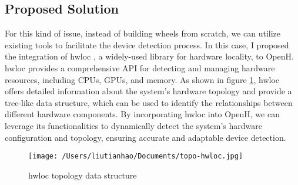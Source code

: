\documentclass[11.5pt]{article}
\begin{document}
\subsection{Proposed Solution}
For this kind of issue, instead of building wheels from scratch, we can utilize existing tools to facilitate the device detection process.
In this case, I proposed the integration of hwloc \cite{hwloc}, a widely-used library for hardware locality, to OpenH. hwloc provides a comprehensive API for detecting and managing hardware resources, including CPUs, GPUs, and memory. 
As shown in figure \ref{fig:hwloc}, hwloc offers detailed information about the system's hardware topology and provide a tree-like data structure, which can be used to identify the relationships between different hardware components. 
By incorporating hwloc into OpenH, we can leverage its functionalities to dynamically detect the system's hardware configuration and topology, ensuring accurate and adaptable device detection.

\begin{figure}[ht]
    \centering
    \texttt{[image: /Users/liutianhao/Documents/topo-hwloc.jpg]}
    \caption{hwloc topology data structure}
    \label{fig:hwloc}
\end{figure}
\end{document}
